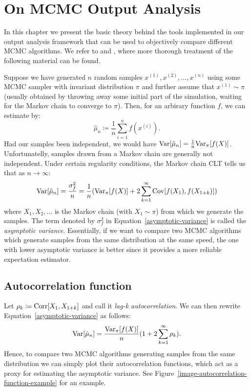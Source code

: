 \documentclass[report.tex]{subfiles}
\begin{document}
\chapter{On MCMC Output Analysis}
\label{mcmc-output-analysis}

In this chapter we present the basic theory behind the tools implemented in our
output analysis framework that can be used to objectively compare different
MCMC algorithms. We refer to
\citet[Chapter 1]{brooks2011handbook} and \citet[Chapter 5]{liu2008monte}, where
more thorough treatment of the following material can be found.

Suppose we have generated $n$ random samples $x^{(1)}, x^{(2)}, \dots, x^{(n)}$ using
some MCMC sampler with invariant distribution $\pi$ and further assume that
$x^{(1)} \sim \pi$ (usually obtained by throwing away some initial part of the
simulation, waiting for the Markov chain to converge to $\pi$).
Then, for an arbirary function $f$, we can estimate  by:
$$
\hat{\mu}_{n} \coloneqq \frac{1}{n} \sum_{i=1}^{n} f(x^{(i)}).
$$
Had our samples been independent, we would have
$\mathrm{Var}\!\left[{\hat{\mu}_{n}}\right] = \frac{1}{n} \mathrm{Var}_{{\pi}}\!\left[{f(X)}\right]$.
Unfortunatelly, samples drawn from a Markov chain are generally not independent.
Under certain regularity conditions, the Markov chain CLT tells us that as $n \to \infty$:
\begin{equation}
\label{asymptotic-variance}
\mathrm{Var}\!\left[{\hat{\mu}_{n}}\right] = \frac{\sigma_{f}^{2}}{n} = \frac{1}{n}(
  \mathrm{Var}_{{\pi}}\!\left[{f(X)}\right]
  + 2 \sum_{k=1}^{\infty} \mathrm{Cov}\!\left[{f(X_{1})}, {f(X_{1+k})}\right])
\end{equation}
where $X_{1}, X_{2}, \dots$ is the Markov chain (with $X_{1} \sim \pi$) from
which we generate the samples.
The term denoted by $\sigma_{f}^{2}$ in Equation~\ref{asymptotic-variance}
is called the \textit{asymptotic variance}.
Essentially, if we want to compare two MCMC algorithms which generate samples
from the same distribution at the same speed, the one with lower asymptotic variance
is better since it provides a more reliable expectation estimator.

\section{Autocorrelation function}

Let $\rho_{k} \coloneqq \mathrm{Corr}\!\left[{X_{1}}, { X_{1+k}}\right]$ and call it \textit{lag-k autocorrelation}.
We can then rewrite Equation~\ref{asymptotic-variance}
as follows:
\begin{equation}
\label{asymptotic-variance-autocorrelation-time}
\mathrm{Var}\!\left[{\hat{\mu}_{n}}\right] = \frac{\mathrm{Var}_{{\pi}}\!\left[{f(X)}\right]}{n}(
1 + 2 \sum_{k=1}^{\infty} \rho_{k}).
\end{equation}
Hence, to compare two MCMC algorithms generating samples from the same distribution
we can simply plot their autocorrelation functions, which act as a proxy for estimating
the asymptotic variance.
See Figure~\ref{image-autocorrelation-function-example} for an example.
\end{document}
